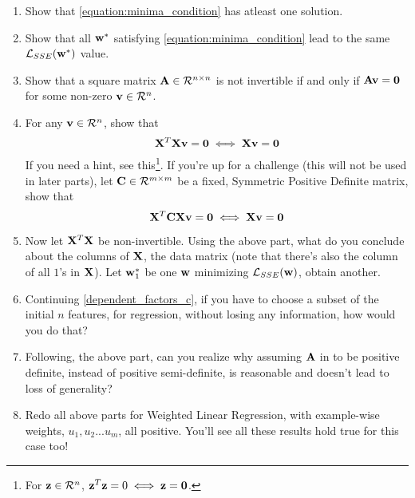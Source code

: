 \begin{enumerate}[label=\alph*)]
\item Show that \autoref{equation:minima_condition} has atleast one solution.
\item Show that all $\mathbf{w}^*$ satisfying \autoref{equation:minima_condition} lead to the same $\mathcal{L}_{SSE}(\mathbf{w}^*)$ value.
\item 
Show that a square matrix $\mathbf{A} \in \mathcal{R}^{n \times n}$ is not invertible if and only if $\mathbf{A} \mathbf{v} = \mathbf{0}$ for some non-zero $\mathbf{v} \in \mathcal{R}^n$.

\item For any $\mathbf{v} \in \mathcal{R}^n$, show that \begin{equation}
 \mathbf{X}^T\mathbf{X}\mathbf{v} = \mathbf{0} \iff \mathbf{X}\mathbf{v} = \mathbf{0}   
\end{equation} 
If you need a hint, see this\footnote{For $\mathbf{z} 
\in \mathcal{R}^n$, $\mathbf{z}^T\mathbf{z} = 0 \iff \mathbf{z} = \mathbf{0}$.}. If you're up for a challenge (this will not be used in later parts), let $\mathbf{C} \in \mathcal{R}^{m \times m}$ be a fixed, Symmetric Positive Definite matrix, show that 
\begin{equation*}
\mathbf{X}^T\mathbf{C}\mathbf{X}\mathbf{v} = \mathbf{0} \iff \mathbf{X}\mathbf{v} = \mathbf{0}
\end{equation*}


\item  \label{dependent_factors_c}
Now let $\mathbf{X}^T\mathbf{X}$ be non-invertible. Using the above part, what do you conclude about the columns of $\mathbf{X}$, the data matrix (note that there's also the column of all $1$'s in $\mathbf{X}$). Let $\mathbf{w}_1^*$ be one $\mathbf{w}$ minimizing $\mathcal{L}_{SSE}(\mathbf{w})$, obtain another.
\item \label{dependent_factors_d}
Continuing \autoref{dependent_factors_c}, if you have to choose a subset of the initial $n$ features, for regression, without losing any information, how would you do that?

\item Following, the above part, can you realize why assuming $\mathbf{A}$ in  to be positive definite, instead of positive semi-definite, is reasonable and doesn't lead to loss of generality?

\item Redo all above parts for Weighted Linear Regression, with example-wise weights, $u_1, u_2...u_m$, all positive. You'll see all these results hold true for this case too! 
\end{enumerate}

